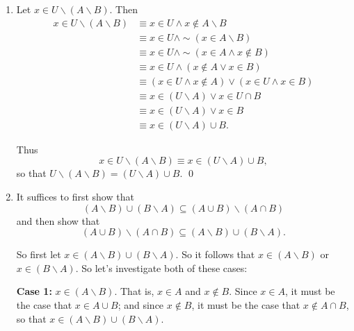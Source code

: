 \begin{enumerate}
\begin{enumerate}
               Thus
               $$x \in (U{\backslash}B){\backslash}(U{\backslash}A) \equiv
                 x \in A{\backslash}B,$$
               so that
               $A{\backslash}B = (U{\backslash}B){\backslash}(U{\backslash}A)$.
               \qed
         \item Let $x \in U{\backslash}(A{\backslash}B)$. Then
               \begin{align*}
                  x \in U{\backslash}(A{\backslash}B)
                     &\equiv x \in U \land x \notin A{\backslash}B \\
                     &\equiv x \in U \land {\sim}(x \in A{\backslash}B) \\
                     &\equiv x \in U \land {\sim}(x \in A \land x \notin B) \\
                     &\equiv x \in U \land (x \notin A \lor x \in B) \\
                     &\equiv (x \in U \land x \notin A) \lor
                              (x \in U \land x \in B) \\
                     &\equiv x \in (U{\backslash}A) \lor x \in U \cap B \\
                     &\equiv x \in (U{\backslash}A) \lor x \in B \\
                     &\equiv x \in (U{\backslash}A) \cup B.
               \end{align*}
               
               Thus
               $$x \in U{\backslash}(A{\backslash}B) \equiv
                 x \in (U{\backslash}A) \cup B,$$
               so that
               $U{\backslash}(A{\backslash}B) = (U{\backslash}A) \cup B$. \qed
         \item It suffices to first show that
               $$(A{\backslash}B) \cup (B{\backslash}A) \subseteq
                 (A \cup B){\backslash}(A \cap B)$$
               and then show that             
               $$(A \cup B){\backslash}(A \cap B) \subseteq
                 (A{\backslash}B) \cup (B{\backslash}A).$$

               So first let $x \in (A{\backslash}B) \cup (B{\backslash}A)$. So
               it follows that $x \in (A{\backslash}B)$ or
               $x \in (B{\backslash}A)$. So let's investigate both of these
               cases:

               \textbf{Case 1:} $x \in (A{\backslash}B)$. That is, $x \in A$
               and $x \notin B$. Since $x \in A$, it must be the case that
               $x \in A \cup B$; and since $x \notin B$, it must be the case
               that $x \notin A \cap B$, so that
               $x \in (A{\backslash}B) \cup (B{\backslash}A)$.


\end{enumerate}
\end{enumerate}
